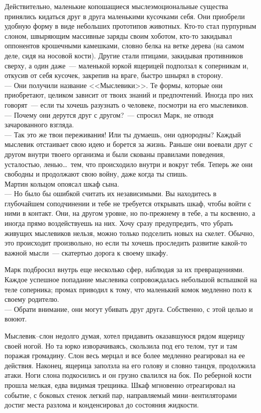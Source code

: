 Действительно, маленькие копошащиеся мыслеэмоциональные существа принялись 
кидаться друг в друга маленькими кусочками себя. Они приобрели удобную форму в 
виде небольших прототипов животных. Кто-то стал пурпурным слоном, швыряющим 
массивные заряды своим хоботом, кто-то закидывал оппонентов крошечными 
камешками, словно белка на ветке дерева (на самом деле, сидя на носовой кости). 
Другие стали птицами, закидывая противников сверху, а один даже~--- маленькой 
юркой ящерицей подползал к соперникам и, откусив от себя кусочек, закрепив на 
враге, быстро шнырял в сторону.\\
--- Они получили название <<Мыслевики>>. Те формы, которые они приобретают, 
целиком зависит от твоих знаний и предпочтений. Иногда про них говорят~--- 
если ты хочешь разузнать о человеке, посмотри на его мыслевиков.\\
--- Почему они дерутся друг с другом?~--- спросил Марк, не отводя 
зачарованного взгляда.\\
--- Так это же твои переживания! Или ты думаешь, они однородны? Каждый мыслевик 
отстаивает свою идею и борется за жизнь. Раньше они воевали друг с другом 
внутри твоего организма и были скованы правилами поведения, усталостью, 
ленью\ldots\ тем, что происходило внутри и вокруг тебя. Теперь же они свободны 
и 
продолжают свою войну, даже когда ты спишь.\\
Мартин кольцом опоясал шкаф сына.\\
--- Но было бы ошибкой считать их независимыми. Вы находитесь в глубочайшем 
соподчинении и тебе не требуется открывать шкаф, чтобы войти с ними в контакт. 
Они, на другом уровне, но по-прежнему в тебе, а ты косвенно, а иногда прямо 
воздействуешь на них. Хочу сразу предупредить, что убрать живущих мыслевиков 
нельзя, можно только подселить новых на скелет. Обычно, это происходит 
произвольно, но если ты хочешь проследить развитие какой-то важной мысли~--- 
скатертью дорога к своему шкафу.

Марк подбросил внутрь еще несколько сфер, наблюдая за их превращениями. Каждое 
успешное попадание мыслевика сопровождалась небольшой вспышкой на теле 
соперника; промах приводил к тому, что маленький комок медленно полз к своему 
родителю.\\
--- Обрати внимание, они могут убивать друг друга. Собственно, с этой целью и 
воюют.

Мыслевик--слон недолго думая, хотел придавить оказавшуюся рядом ящерицу своей 
ногой. Но та юрко изворачиваясь, скользила под его телом, тут и там поражая 
громадину. Слон весь мерцал и все более медленно реагировал на ее действия. 
Наконец, ящерица заползла на его голову и словно танцуя, продолжила атаки.
Ноги слона подкосились и он грузно свалился на бок. По реберной кости прошла 
мелкая, едва видимая трещинка. Шкаф мгновенно отреагировал на событие, с 
боковых стенок легкий пар, направляемый мини--вентиляторами достиг места 
разлома 
и конденсировал до состояния жидкости.

